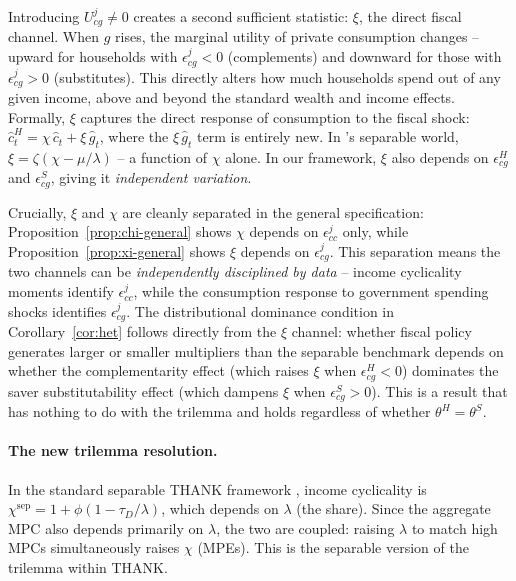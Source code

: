 \smallskip
Introducing $U_{cg}^{j}\neq 0$ creates a second sufficient statistic: $\xi$, the
direct fiscal channel. When $g$ rises, the marginal utility of private
consumption changes -- upward for households with $\epsilon^{j}_{cg}<0$
(complements) and downward for those with $\epsilon^{j}_{cg}>0$ (substitutes).
This directly alters how much \HtM{} households spend out of any given income,
above and beyond the standard wealth and income effects. Formally, $\xi$ captures
the direct response of \HtM{} consumption to the fiscal shock:
$\hat c^{H}_{t}=\chi\,\hat c_{t}+\xi\,\hat g_{t}$, where the $\xi\,\hat g_{t}$
term is entirely new. In \bilbiie{}'s separable world,
$\xi=\zeta(\chi-\mu/\lambda)$ -- a function of $\chi$ alone. In our framework,
$\xi$ also depends on $\epsilon^{H}_{cg}$ and $\epsilon^{S}_{cg}$, giving it
\emph{independent variation}.

\smallskip
Crucially, $\xi$ and $\chi$ are cleanly separated in the general specification:
Proposition~\ref{prop:chi-general} shows $\chi$ depends on $\epsilon^{j}_{cc}$
only, while Proposition~\ref{prop:xi-general} shows $\xi$ depends on
$\epsilon^{j}_{cg}$. This separation means the two channels can be
\emph{independently disciplined by data} -- income cyclicality moments identify
$\epsilon^{j}_{cc}$, while the consumption response to government spending
shocks identifies $\epsilon^{j}_{cg}$. The distributional dominance condition
in Corollary~\ref{cor:het} follows directly from the $\xi$ channel: whether
fiscal policy generates larger or smaller multipliers than the separable
benchmark depends on whether the \HtM{} complementarity effect (which raises
$\xi$ when $\epsilon^{H}_{cg}<0$) dominates the saver substitutability effect
(which dampens $\xi$ when $\epsilon^{S}_{cg}>0$). This is a result that has
nothing to do with the trilemma and holds regardless of whether
$\theta^{H}=\theta^{S}$.

\paragraph{The new trilemma resolution.}
In the standard separable THANK framework \citep{Bilbiie2025}, income cyclicality
is $\chi^{\mathrm{sep}}=1+\phi(1-\tau_{D}/\lambda)$, which depends on $\lambda$
(the \HtM{} share). Since the aggregate MPC also depends primarily on $\lambda$,
the two are coupled: raising $\lambda$ to match high MPCs simultaneously raises
$\chi$ (MPEs). This is the separable version of the trilemma within THANK.

